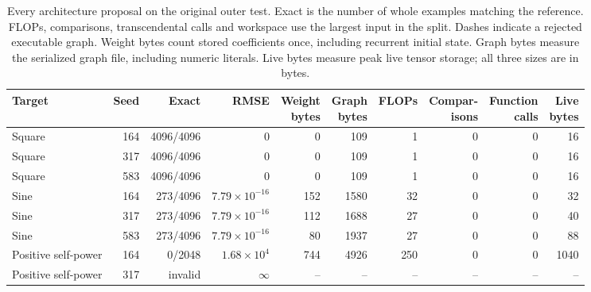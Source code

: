 \begin{table}[p]\centering\footnotesize

\caption{Every architecture proposal on the original outer test. Exact is the number of whole examples matching the reference. FLOPs, comparisons, transcendental calls and workspace use the largest input in the split. Dashes indicate a rejected executable graph. Weight bytes count stored coefficients once, including recurrent initial state. Graph bytes measure the serialized graph file, including numeric literals. Live bytes measure peak live tensor storage; all three sizes are in bytes.}\label{tab:architecture_all}

\setlength{\tabcolsep}{2.3pt}

\begin{tabular}{@{}lr r r r r r r r r@{}}\toprule

Target & Seed & Exact & RMSE & \shortstack{Weight\\bytes} & \shortstack{Graph\\bytes} & FLOPs & \shortstack{Compar-\\isons} & \shortstack{Function\\calls} & \shortstack{Live\\bytes}\\\midrule

Square & 164 & 4096/4096 & 0 & 0 & 109 & 1 & 0 & 0 & 16\\

Square & 317 & 4096/4096 & 0 & 0 & 109 & 1 & 0 & 0 & 16\\

Square & 583 & 4096/4096 & 0 & 0 & 109 & 1 & 0 & 0 & 16\\

\addlinespace[2pt]

Sine & 164 & 273/4096 & $7.79\times10^{-16}$ & 152 & 1580 & 32 & 0 & 0 & 32\\

Sine & 317 & 273/4096 & $7.79\times10^{-16}$ & 112 & 1688 & 27 & 0 & 0 & 40\\

Sine & 583 & 273/4096 & $7.79\times10^{-16}$ & 80 & 1937 & 27 & 0 & 0 & 88\\

\addlinespace[2pt]

Positive self-power & 164 & 0/2048 & $1.68\times10^{4}$ & 744 & 4926 & 250 & 0 & 0 & 1040\\

Positive self-power & 317 & invalid & $\infty$ & -- & -- & -- & -- & -- & --\\


\end{tabular}
\end{table}
